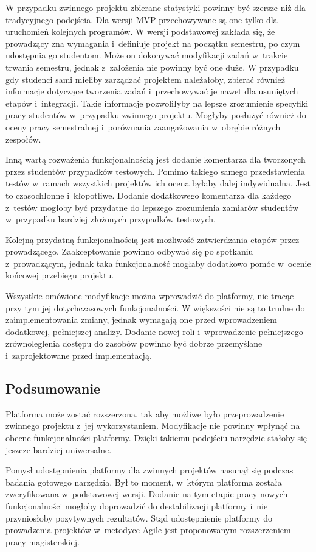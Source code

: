 W przypadku zwinnego projektu zbierane statystyki powinny być szersze niż dla tradycyjnego podejścia.
Dla wersji MVP przechowywane są one tylko dla uruchomień kolejnych programów.
W wersji podstawowej zakłada się, że prowadzący zna wymagania i~definiuje projekt na początku semestru, po czym udostępnia go studentom.
Może on dokonywać modyfikacji zadań w~trakcie trwania semestru, jednak z~założenia nie powinny być one duże.
W przypadku gdy studenci sami mieliby zarządzać projektem należałoby, zbierać również informacje dotyczące tworzenia zadań i~przechowywać je nawet dla usuniętych etapów i~integracji.
Takie informacje pozwoliłyby na lepsze zrozumienie specyfiki pracy studentów w~przypadku zwinnego projektu.
Mogłyby posłużyć również do oceny pracy semestralnej i~porównania zaangażowania w~obrębie różnych zespołów.

Inną wartą rozważenia funkcjonalnością jest dodanie komentarza dla tworzonych przez studentów przypadków testowych.
Pomimo takiego samego przedstawienia testów w~ramach wszystkich projektów ich ocena byłaby dalej indywidualna.
Jest to czasochłonne i~kłopotliwe.
Dodanie dodatkowego komentarza dla każdego z~testów mogłoby być przydatne do lepszego zrozumienia zamiarów studentów w~przypadku bardziej złożonych przypadków testowych.

Kolejną przydatną funkcjonalnością jest możliwość zatwierdzania etapów przez prowadzącego.
Zaakceptowanie powinno odbywać się po spotkaniu z~prowadzącym, jednak taka funkcjonalność mogłaby dodatkowo pomóc w~ocenie końcowej przebiegu projektu.

Wszystkie omówione modyfikacje można wprowadzić do platformy, nie tracąc przy tym jej dotychczasowych funkcjonalności.
W większości nie są to trudne do zaimplementowania zmiany, jednak wymagają one przed wprowadzeniem dodatkowej, pełniejszej analizy.
Dodanie nowej roli i~wprowadzenie pełniejszego zrównoleglenia dostępu do zasobów powinno być dobrze przemyślane i~zaprojektowane przed implementacją.

\subsection{Podsumowanie}

Platforma może zostać rozszerzona, tak aby możliwe było przeprowadzenie zwinnego projektu z~jej wykorzystaniem.
Modyfikacje nie powinny wpłynąć na obecne funkcjonalności platformy.
Dzięki takiemu podejściu narzędzie stałoby się jeszcze bardziej uniwersalne.

Pomysł udostępnienia platformy dla zwinnych projektów nasunął się podczas badania gotowego narzędzia.
Był to moment, w~którym platforma została zweryfikowana w~podstawowej wersji.
Dodanie na tym etapie pracy nowych funkcjonalności mogłoby doprowadzić do destabilizacji platformy i~nie przyniosłoby pozytywnych rezultatów.
Stąd udostępnienie platformy do prowadzenia projektów w~metodyce Agile jest proponowanym rozszerzeniem pracy magisterskiej.


